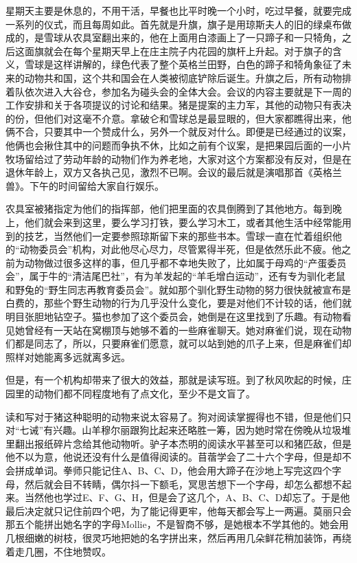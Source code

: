 星期天主要是休息的，不用干活，早餐也比平时晚一个小时，吃过早餐，就要完成一系列的仪式，而且每周如此。首先就是升旗，旗子是用琼斯夫人的旧的绿桌布做成的，是雪球从农具室翻出来的，他在上面用白漆画上了一只蹄子和一只犄角，之后这面旗就会在每个星期天早上在庄主院子内花园的旗杆上升起。对于旗子的含义，雪球是这样讲解的，绿色代表了整个英格兰田野，白色的蹄子和犄角象征了未来的动物共和国，这个共和国会在人类被彻底铲除后诞生。升旗之后，所有动物排着队依次进入大谷仓，参加名为碰头会的全体大会。会议的内容主要就是下一周的工作安排和关于各项提议的讨论和结果。猪是提案的主力军，其他的动物只有表决的份，但他们对这毫不介意。拿破仑和雪球总是最显眼的，但大家都瞧得出来，他俩不合，只要其中一个赞成什么，另外一个就反对什么。即便是已经通过的议案，他俩也会揪住其中的问题而争执不休，比如之前有个议案，是把果园后面的一小片牧场留给过了劳动年龄的动物们作为养老地，大家对这个方案都没有反对，但是在退休年龄上，双方又各执己见，激烈不已啊。会议的最后就是演唱那首《英格兰兽》。下午的时间留给大家自行娱乐。

农具室被猪指定为他们的指挥部，他们把里面的农具倒腾到了其他地方。每到晚上，他们就会来到这里，要么学习打铁，要么学习木工，或者其他生活中经常能用到的技艺，当然他们一定要参照琼斯留下来的那些书本。雪球一直在忙着组织他的“动物委员会”机构，对此他尽心尽力，尽管累得半死，但是依然乐此不疲。他之前为动物做过很多这样的事，但几乎都不幸地失败了，比如属于母鸡的“产蛋委员会”，属于牛的“清洁尾巴社”，有为羊发起的“羊毛增白运动”，还有专为驯化老鼠和野兔的“野生同志再教育委员会”。就如那个驯化野生动物的努力很快就被宣布是白费的，那些个野生动物的行为几乎没什么变化，要是对他们不计较的话，他们就明目张胆地钻空子。猫也参加了这个委员会，她倒是在这里找到了乐趣。有动物看见她曾经有一天站在窝棚顶与她够不着的一些麻雀聊天。她对麻雀们说，现在动物们都是同志了，所以，只要麻雀们愿意，就可以站到她的爪子上来，但是麻雀们却照样对她能离多远就离多远。

但是，有一个机构却带来了很大的效益，那就是读写班。到了秋风吹起的时候，庄园里的动物们都不同程度地有了点文化，至少不是文盲了。

读和写对于猪这种聪明的动物来说太容易了。狗对阅读掌握得也不错，但是他们只对“七诫”有兴趣。山羊穆尔丽跟狗比起来还略胜一筹，因为她时常在傍晚从垃圾堆里翻出报纸碎片念给其他动物听。驴子本杰明的阅读水平甚至可以和猪匹敌，但是他不以为意，他说还没有什么是值得阅读的。苜蓿学会了二十六个字母，但是却不会拼成单词。拳师只能记住A、B、C、D，他会用大蹄子在沙地上写完这四个字母，然后就会目不转睛，偶尔抖一下额毛，冥思苦想下一个字母，却怎么都想不起来。当然他也学过E、F、G、H，但是会了这几个，A、B、C、D却忘了。于是他最后决定就只记住前四个吧，为了能记得更牢，他每天都会写上一两遍。莫丽只会那五个能拼出她名字的字母Mollie，不是智商不够，是她根本不学其他的。她会用几根细嫩的树枝，很灵巧地把她的名字拼出来，然后再用几朵鲜花稍加装饰，再绕着走几圈，不住地赞叹。

